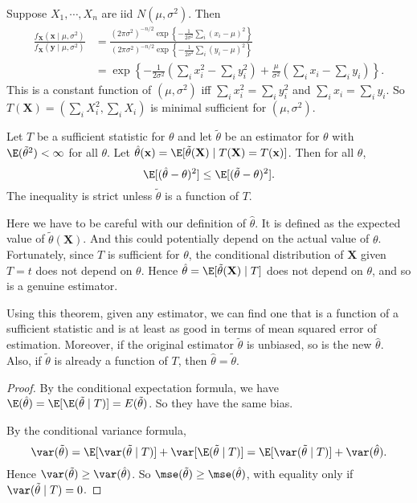 \documentclass[a4paper]{article}
\begin{document}
\begin{eg}
  Suppose $X_1, \cdots, X_n$ are iid $N(\mu, \sigma^2)$. Then
  \begin{align*}
    \frac{f_\mathbf{X}(\mathbf{x}\mid \mu, \sigma^2)}{f_\mathbf{X}(\mathbf{y}\mid \mu, \sigma^2)} &= \frac{(2\pi\sigma^2)^{-n/2}\exp\left\{-\frac{1}{2\sigma^2}\sum_i(x_i - \mu)^2\right\}}{(2\pi\sigma^2)^{-n/2}\exp\left\{-\frac{1}{2\sigma^2}\sum_i(y_i - \mu)^2\right\}}\\
    &=\exp\left\{-\frac{1}{2\sigma^2}\left(\sum_i x_i^2 - \sum_i y_i^2\right) + \frac{\mu}{\sigma^2}\left(\sum_{i}x_i - \sum_i y_i\right)\right\}.
  \end{align*}
  This is a constant function of $(\mu, \sigma^2)$ iff $\sum_i x_i^2 = \sum_i y_i^2$ and $\sum_i x_i = \sum_i y_i$. So $T(\mathbf{X}) = (\sum_i X_i^2, \sum_i X_i)$ is minimal sufficient for $(\mu, \sigma^2)$.
\end{eg}

\begin{thm}
  Let $T$ be a sufficient statistic for $\theta$ and let $\tilde{\theta}$ be an estimator for $\theta$ with $\E(\tilde{\theta}^2) < \infty$ for all $\theta$. Let $\hat{\theta}(\mathbf{x}) = \E[\tilde{\theta}(\mathbf{X})\mid T(\mathbf{X}) = T(\mathbf{x})]$. Then for all $\theta$,
  \[
    \E[(\hat{\theta} - \theta)^2] \leq \E[(\tilde{\theta} - \theta)^2].
  \]
  The inequality is strict unless $\tilde{\theta}$ is a function of $T$.
\end{thm}
Here we have to be careful with our definition of $\hat{\theta}$. It is defined as the expected value of $\tilde{\theta}(\mathbf{X})$. And this could potentially depend on the actual value of $\theta$. Fortunately, since $T$ is sufficient for $\theta$, the conditional distribution of $\mathbf{X}$ given $T = t$ does not depend on $\theta$. Hence $\hat{\theta} = \E[\tilde{\theta}(\mathbf{X})\mid T]$ does not depend on $\theta$, and so is a genuine estimator.

Using this theorem, given any estimator, we can find one that is a function of a sufficient statistic and is at least as good in terms of mean squared error of estimation. Moreover, if the original estimator $\tilde{\theta}$ is unbiased, so is the new $\hat{\theta}$. Also, if $\tilde{\theta}$ is already a function of $T$, then $\hat{\theta} = \tilde{\theta}$.

\begin{proof}
  By the conditional expectation formula, we have $\E(\hat{\theta}) = \E[\E(\tilde{\theta}\mid T)] = E(\tilde{\theta})$. So they have the same bias.

  By the conditional variance formula,
  \[
    \var(\tilde{\theta}) = \E[\var (\tilde{\theta}\mid T)] + \var [\E(\tilde{\theta}\mid T)] = \E[\var(\tilde{\theta}\mid T)] + \var(\hat{\theta}).
  \]
  Hence $\var(\tilde{\theta}) \geq \var (\hat{\theta})$. So $\mse(\tilde{\theta}) \geq \mse(\hat{\theta})$, with equality only if $\var(\tilde{\theta}\mid T) = 0$.
\end{proof}
\end{document}
